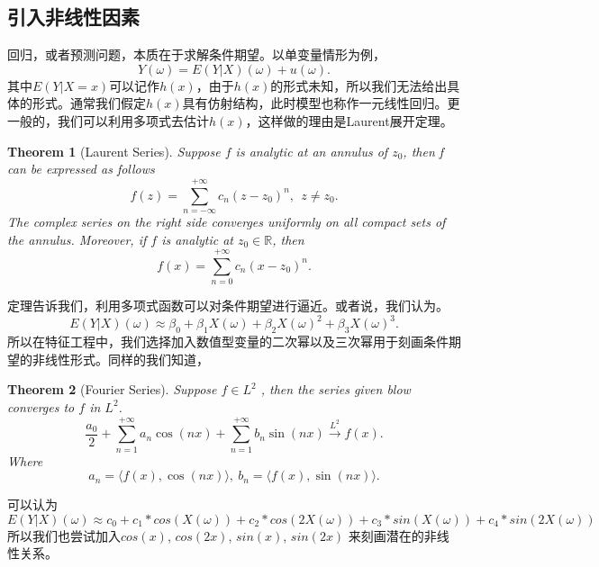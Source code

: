 \documentclass[12pt]{article}
\newtheorem{Theorem}{Theorem}[section]
\begin{document}
\subsection{引入非线性因素}
回归，或者预测问题，本质在于求解条件期望。以单变量情形为例，
$$
Y(\omega) = E(Y|X)(\omega) + u(\omega).
$$
其中$E(Y|X=x)$可以记作$h(x)$，由于$h(x)$的形式未知，所以我们无法给出具体的形式。通常我们假定$h(x)$具有仿射结构，此时模型也称作一元线性回归。更一般的，我们可以利用多项式去估计$h(x)$，这样做的理由是Laurent展开定理。

\begin{Theorem}[Laurent Series]{\label{LS}} 
	Suppose $f$ is analytic at an annulus of $z_0$, then f can be expressed as follows
	$$
	f(z) = \sum_{n=-\infty}^{+\infty}c_n(z-z_0)^n, \ \  z\neq z_0.
	$$
	The complex series on the right side converges uniformly on all compact sets of the annulus. Moreover, if $f$ is analytic at $z_0\in\mathbb{R}$, then 
	$$
	f(x) = \sum_{n=0}^{+\infty}c_n(x-z_0)^n.
	$$
\end{Theorem}
定理告诉我们，利用多项式函数可以对条件期望进行逼近。或者说，我们认为。
$$
E(Y|X)(\omega) \approx \beta_0 + \beta_1X(\omega) + \beta_2X(\omega)^2 + \beta_3X(\omega)^3.
$$
所以在特征工程中，我们选择加入数值型变量的二次幂以及三次幂用于刻画条件期望的非线性形式。同样的我们知道，
\begin{Theorem}[Fourier Series]{\label{FS}} 
	Suppose $f\in L^2$ , then the series given blow converges to $f$ in $L^2$. 
	$$
	\frac{a_0}{2} + \sum_{n=1}^{+\infty}a_n\cos(nx)+\sum_{n=1}^{+\infty}b_n\sin(nx) \stackrel{L^2}{\rightarrow} f(x).
	$$
	Where 
	$$
	a_n = \langle f(x),\cos(nx)\rangle, \ b_n = \langle f(x),\sin(nx)\rangle.
	$$
\end{Theorem}
可以认为
$$
E(Y|X)(\omega) \approx c_0 + c_1*cos(X(\omega))+c_2*cos(2X(\omega))+c_3*sin(X(\omega))+c_4*sin(2X(\omega))
$$
所以我们也尝试加入$cos(x)$, $cos(2x)$, $sin(x)$, $sin(2x)$ 来刻画潜在的非线性关系。\par
\end{document}

